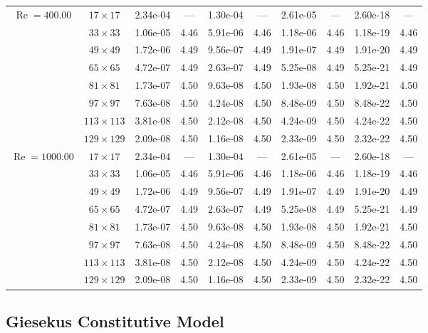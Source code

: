 \documentclass[preprint, 12pt]{elsarticle}
\begin{document}
\begin{center}
\begin{table}[H]
{\begin{tabular*}{\textwidth}{@{\extracolsep\fill}cccccccccc@{}}
    \hline
    \multirow{7}{*}{$\operatorname{Re}=400.00$} & $17\times 17$ & 2.34e-04 & --- & 1.30e-04 & --- & 2.61e-05 & --- & 2.60e-18 & --- \\
    & $33\times 33$ & 1.06e-05 & 4.46 & 5.91e-06 & 4.46 & 1.18e-06 & 4.46 & 1.18e-19 & 4.46 \\
    & $49\times 49$ & 1.72e-06 & 4.49 & 9.56e-07 & 4.49 & 1.91e-07 & 4.49 & 1.91e-20 & 4.49 \\
    \multirow{3}{*}{$\operatorname{Wi}=10$} & $65\times 65$ & 4.72e-07 & 4.49 & 2.63e-07 & 4.49 & 5.25e-08 & 4.49 & 5.25e-21 & 4.49 \\
    & $81\times 81$ & 1.73e-07 & 4.50 & 9.63e-08 & 4.50 & 1.93e-08 & 4.50 & 1.92e-21 & 4.50 \\
    & $97\times 97$ & 7.63e-08 & 4.50 & 4.24e-08 & 4.50 & 8.48e-09 & 4.50 & 8.48e-22 & 4.50 \\
    & $113\times 113$ & 3.81e-08 & 4.50 & 2.12e-08 & 4.50 & 4.24e-09 & 4.50 & 4.24e-22 & 4.50 \\
    & $129\times 129$ & 2.09e-08 & 4.50 & 1.16e-08 & 4.50 & 2.33e-09 & 4.50 & 2.32e-22 & 4.50 \\
    \hline
    \multirow{7}{*}{$\operatorname{Re}=1000.00$} & $17\times 17$ & 2.34e-04 & --- & 1.30e-04 & --- & 2.61e-05 & --- & 2.60e-18 & --- \\
    & $33\times 33$ & 1.06e-05 & 4.46 & 5.91e-06 & 4.46 & 1.18e-06 & 4.46 & 1.18e-19 & 4.46 \\
    & $49\times 49$ & 1.72e-06 & 4.49 & 9.56e-07 & 4.49 & 1.91e-07 & 4.49 & 1.91e-20 & 4.49 \\
    \multirow{3}{*}{$\operatorname{Wi}=10$} & $65\times 65$ & 4.72e-07 & 4.49 & 2.63e-07 & 4.49 & 5.25e-08 & 4.49 & 5.25e-21 & 4.49 \\
    & $81\times 81$ & 1.73e-07 & 4.50 & 9.63e-08 & 4.50 & 1.93e-08 & 4.50 & 1.92e-21 & 4.50 \\
    & $97\times 97$ & 7.63e-08 & 4.50 & 4.24e-08 & 4.50 & 8.48e-09 & 4.50 & 8.48e-22 & 4.50 \\
    & $113\times 113$ & 3.81e-08 & 4.50 & 2.12e-08 & 4.50 & 4.24e-09 & 4.50 & 4.24e-22 & 4.50 \\
    & $129\times 129$ & 2.09e-08 & 4.50 & 1.16e-08 & 4.50 & 2.33e-09 & 4.50 & 2.32e-22 & 4.50 \\
    \hline
    \end{tabular*}
}
\end{table}
\end{center}

\subsection{Giesekus Constitutive Model}
\label{Appendix_more_wi_giesekus}
\end{document}
